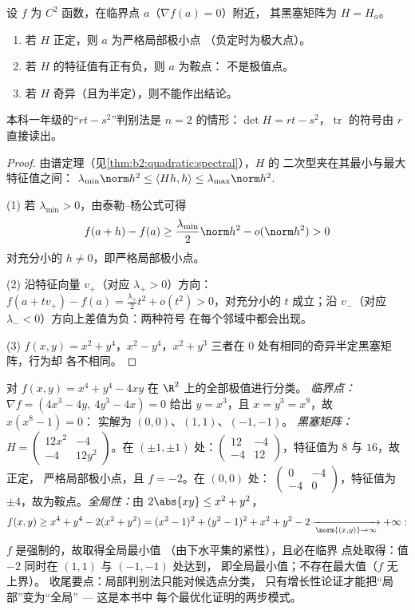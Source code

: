 \begin{theorem}[二阶极值判别法（已证）]\label{thm:b2:diffcalc:extrema}
设 $f$ 为 $C^2$ 函数，在临界点 $a$（$\nabla f(a) = 0$）附近，
其黑塞矩阵为 $H = H_a$。
\begin{enumerate}
  \item 若 $H$ 正定，则 $a$ 为严格局部极小点
        （负定时为极大点）。
  \item 若 $H$ 的特征值有正有负，则 $a$ 为鞍点：
        不是极值点。
  \item 若 $H$ 奇异（且为半定），则不能作出结论。
\end{enumerate}
本科一年级的“$rt - s^2$”判别法是 $n = 2$ 的情形：$\det H = rt -
s^2$，$\operatorname{tr}$ 的符号由 $r$ 直接读出。
\end{theorem}

\begin{proof}
由谱定理（见\cref{thm:b2:quadratic:spectral}），$H$ 的
二次型夹在其最小与最大特征值之间：
$\lambda_{\min}\norm h^2 \leq \langle Hh, h\rangle \leq
\lambda_{\max}\norm h^2$.

(1) 若 $\lambda_{\min} > 0$，由泰勒--杨公式可得
\[
f(a + h) - f(a) \geq \frac{\lambda_{\min}}{2}\norm h^2 -
o(\norm h^2) > 0
\]
对充分小的 $h \neq 0$，即严格局部极小点。

(2) 沿特征向量 $v_+$（对应 $\lambda_+ > 0$）方向：$f(a + tv_+) -
f(a) = \frac{\lambda_+}{2}t^2 + o(t^2) > 0$，对充分小的 $t$ 成立；沿
$v_-$（对应 $\lambda_- < 0$）方向上差值为负：两种符号
在每个邻域中都会出现。

(3) $f(x,y) = x^2 + y^4$，$x^2 - y^4$，$x^2 + y^3$ 三者在
$0$ 处有相同的奇异半定黑塞矩阵，行为却
各不相同。
\end{proof}

\begin{example}\label{ex:b2:diffcalc:quarticrun}
对 $f(x, y) = x^4 + y^4 - 4xy$ 在 $\R^2$ 上的全部极值进行分类。
\emph{临界点：} $\nabla f = (4x^3 - 4y,\ 4y^3 - 4x) =
0$ 给出 $y = x^3$，且 $x = y^3 = x^9$，故 $x(x^8 - 1) = 0$：
实解为 $(0,0)$、$(1,1)$、$(-1,-1)$。
\emph{黑塞矩阵：} $H = \begin{pmatrix} 12x^2 & -4\\ -4 &
12y^2\end{pmatrix}$。在 $(\pm1, \pm1)$ 处：$\begin{pmatrix} 12 &
-4\\ -4 & 12\end{pmatrix}$，特征值为 $8$ 与 $16$，故正定，
严格局部极小点，且 $f = -2$。在 $(0,0)$ 处：
$\begin{pmatrix} 0 & -4\\ -4 & 0\end{pmatrix}$，特征值为
$\pm4$，故为鞍点。\emph{全局性：}由 $2\abs{xy} \leq x^2 +
y^2$，
\[
f(x, y) \geq x^4 + y^4 - 2(x^2 + y^2)
= (x^2 - 1)^2 + (y^2 - 1)^2 + x^2 + y^2 - 2
\xrightarrow[\norm{(x,y)}\to\infty]{} +\infty :
\]
$f$ 是强制的，故取得全局最小值
（由下水平集的紧性），且必在临界
点处取得：值 $-2$ 同时在 $(1,1)$ 与 $(-1,-1)$ 处达到，
即全局最小值；不存在最大值（$f$ 无上界）。
收尾要点：局部判别法只能对候选点分类，
只有增长性论证才能把“局部”变为“全局” --- 这是本书中
每个最优化证明的两步模式。
\end{example}

